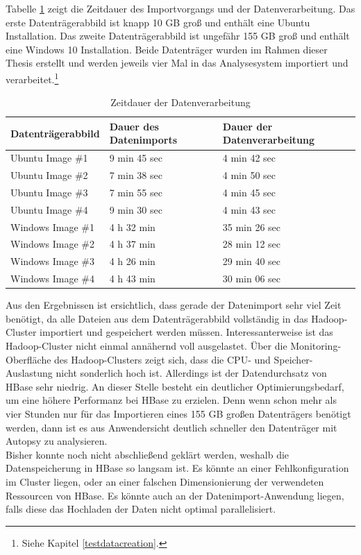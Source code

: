 \noindent
Tabelle \ref{tab:performance_results} zeigt die Zeitdauer des Importvorgangs und der Datenverarbeitung. Das erste Datenträgerabbild ist knapp 10 GB groß und enthält eine Ubuntu Installation. Das zweite Datenträgerabbild ist ungefähr 155 GB groß und enthält eine Windows 10 Installation. Beide Datenträger wurden im Rahmen dieser Thesis erstellt und werden jeweils vier Mal in das Analysesystem importiert und verarbeitet.\footnote{Siehe Kapitel \ref{testdatacreation}.} \\


\begin{table}[ht]
\centering
\begin{tabular}{l|l|l}
Datenträgerabbild & Dauer des Datenimports & Dauer der Datenverarbeitung	\\ \hline
Ubuntu Image \#1 		& 9 min 45 sec	& 4 min 42 sec  \\
Ubuntu Image \#2 		& 7 min 38 sec	& 4 min 50 sec  \\
Ubuntu Image \#3 		& 7 min 55 sec	& 4 min 45 sec  \\
Ubuntu Image \#4 		& 9 min 30 sec	& 4 min 43 sec	\\ \hline
Windows Image \#1 		& 4 h 32 min		& 35 min 26 sec	\\
Windows Image \#2 		& 4 h 37 min		& 28 min 12 sec	\\
Windows Image \#3 		& 4 h 26 min		& 29 min 40 sec	\\
Windows Image \#4 		& 4 h 43 min		& 30 min 06 sec	\\
\end{tabular}
\caption{Zeitdauer der Datenverarbeitung}
\label{tab:performance_results}
\end{table}

\noindent
Aus den Ergebnissen ist ersichtlich, dass gerade der Datenimport sehr viel Zeit benötigt, da alle Dateien aus dem Datenträgerabbild vollständig in das Hadoop-Cluster importiert und gespeichert werden müssen. Interessanterweise ist das Hadoop-Cluster nicht einmal annähernd voll ausgelastet. Über die Monitoring-Oberfläche des Hadoop-Clusters zeigt sich, dass die CPU- und Speicher-Auslastung nicht sonderlich hoch ist. Allerdings ist der Datendurchsatz von HBase sehr niedrig. An dieser Stelle besteht ein deutlicher Optimierungsbedarf, um eine höhere Performanz bei HBase zu erzielen. Denn wenn schon mehr als vier Stunden nur für das Importieren eines 155 GB großen Datenträgers benötigt werden, dann ist es aus Anwendersicht deutlich schneller den Datenträger mit Autopsy zu analysieren.\\
Bisher konnte noch nicht abschließend geklärt werden, weshalb die Datenspeicherung in HBase so langsam ist. Es könnte an einer Fehlkonfiguration im Cluster liegen, oder an einer falschen Dimensionierung der verwendeten Ressourcen von HBase. Es könnte auch an der Datenimport-Anwendung liegen, falls diese das Hochladen der Daten nicht optimal parallelisiert.\\

